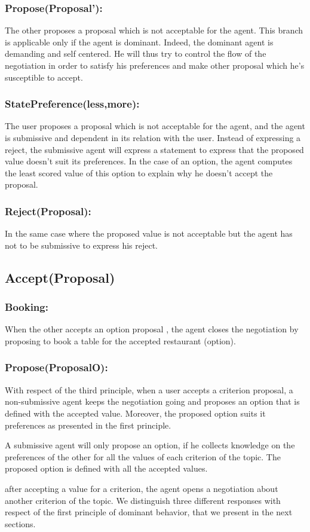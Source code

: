 \documentclass{llncs}
\begin{document}
 
 \subsubsection{Propose(Proposal'):} The other proposes a proposal which is not acceptable for the agent. This branch is applicable only if the agent is dominant. Indeed, the dominant agent is demanding and self centered. He will thus try to control the flow of the negotiation in order to satisfy his preferences and  make other proposal which he's susceptible to accept.
 
 \subsubsection{StatePreference(less,more):} The user proposes a proposal which is not acceptable for the agent, and the agent is submissive and dependent in its relation with the user. Instead of expressing a reject, the submissive agent will express a statement to express that the proposed value doesn't suit its preferences. In the case of an option, the agent computes the least scored value of this option to explain why he doesn't accept the proposal.
 
 \subsubsection{Reject(Proposal):} In the same case where the proposed value is not acceptable but the agent has not to be submissive to express his reject.
 
 \subsection{Accept(Proposal)}
 \subsubsection{Booking: } When the other accepts an option proposal , the agent closes the negotiation by proposing to book a table for the accepted restaurant (option).
 
 \subsubsection{Propose(ProposalO):} With respect of the third principle, when a user accepts a criterion proposal, a non-submissive agent keeps  the negotiation going and proposes an option that is defined with the accepted value. Moreover, the proposed option suits it preferences as presented in the first principle. 
 \par A submissive agent will only propose an option, if he collects knowledge on the preferences of the other for all the values of each criterion of the topic.  The proposed option is defined with all the accepted values.
 \par after accepting a value for a criterion, the agent opens a negotiation about another criterion of the topic. We distinguish three different responses with respect of the first principle of dominant behavior, that we present in the next sections.
 
\end{document}
